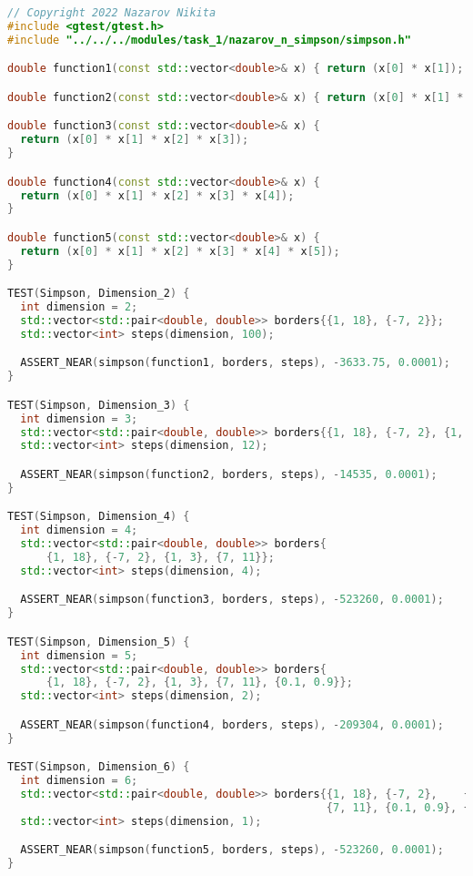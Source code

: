 \documentclass{report}
\begin{document}
\begin{lstlisting}[language=C++]
// Copyright 2022 Nazarov Nikita
#include <gtest/gtest.h>
#include "../../../modules/task_1/nazarov_n_simpson/simpson.h"

double function1(const std::vector<double>& x) { return (x[0] * x[1]); }

double function2(const std::vector<double>& x) { return (x[0] * x[1] * x[2]); }

double function3(const std::vector<double>& x) {
  return (x[0] * x[1] * x[2] * x[3]);
}

double function4(const std::vector<double>& x) {
  return (x[0] * x[1] * x[2] * x[3] * x[4]);
}

double function5(const std::vector<double>& x) {
  return (x[0] * x[1] * x[2] * x[3] * x[4] * x[5]);
}

TEST(Simpson, Dimension_2) {
  int dimension = 2;
  std::vector<std::pair<double, double>> borders{{1, 18}, {-7, 2}};
  std::vector<int> steps(dimension, 100);

  ASSERT_NEAR(simpson(function1, borders, steps), -3633.75, 0.0001);
}

TEST(Simpson, Dimension_3) {
  int dimension = 3;
  std::vector<std::pair<double, double>> borders{{1, 18}, {-7, 2}, {1, 3}};
  std::vector<int> steps(dimension, 12);

  ASSERT_NEAR(simpson(function2, borders, steps), -14535, 0.0001);
}

TEST(Simpson, Dimension_4) {
  int dimension = 4;
  std::vector<std::pair<double, double>> borders{
      {1, 18}, {-7, 2}, {1, 3}, {7, 11}};
  std::vector<int> steps(dimension, 4);

  ASSERT_NEAR(simpson(function3, borders, steps), -523260, 0.0001);
}

TEST(Simpson, Dimension_5) {
  int dimension = 5;
  std::vector<std::pair<double, double>> borders{
      {1, 18}, {-7, 2}, {1, 3}, {7, 11}, {0.1, 0.9}};
  std::vector<int> steps(dimension, 2);

  ASSERT_NEAR(simpson(function4, borders, steps), -209304, 0.0001);
}

TEST(Simpson, Dimension_6) {
  int dimension = 6;
  std::vector<std::pair<double, double>> borders{{1, 18}, {-7, 2},    {1, 3},
                                                 {7, 11}, {0.1, 0.9}, {2, 3}};
  std::vector<int> steps(dimension, 1);

  ASSERT_NEAR(simpson(function5, borders, steps), -523260, 0.0001);
}
\end{lstlisting}
\end{document}
